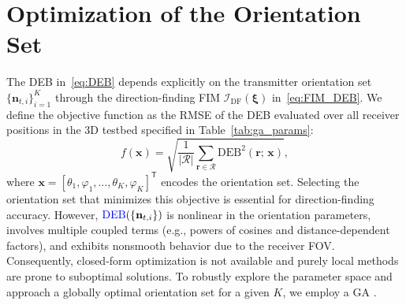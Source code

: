 \documentclass[journal]{IEEEtran}
\newcommand{\added}[1]{{\color{blue}#1}}
\begin{document}
\section{Optimization of the Orientation Set}
\label{sec:optimization}

\added{The DEB in~\eqref{eq:DEB} depends explicitly on the transmitter orientation set $\{\mathbf{n}_{t,i}\}_{i=1}^K$ through the direction-finding FIM $\mathcal{I}_{\mathrm{DF}}(\boldsymbol\xi)$ in~\eqref{eq:FIM_DEB}. We define the objective function as the RMSE of the DEB evaluated over all receiver positions in the 3D testbed specified in Table~\ref{tab:ga_params}:
\begin{equation}
f(\mathbf{x}) = \sqrt{\frac{1}{|\mathcal{R}|}\sum_{\mathbf{r}\in\mathcal{R}}\mathrm{DEB}^2(\mathbf{r};\,\mathbf{x})},
\label{eq:GA_objective}
\end{equation}
where $\mathbf{x}=[\theta_1,\varphi_1,\ldots,\theta_K,\varphi_K]^{\mathsf T}$ encodes the orientation set.}
Selecting the orientation set that minimizes this objective is essential for \added{direction-finding} accuracy. However, \(\added{\mathrm{DEB}}(\{\mathbf n_{t,i}\})\) is nonlinear in the orientation parameters, involves multiple coupled terms (e.g., powers of cosines and distance-dependent factors), and exhibits nonsmooth behavior due to the receiver FOV. Consequently, closed-form optimization is not available and purely local methods are prone to suboptimal solutions. To robustly explore the parameter space and approach a globally optimal orientation set for a given \(K\), we employ a GA \cite{Haupt2004}.
\end{document}
